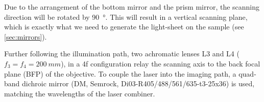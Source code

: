     Due to the arrangement of the bottom mirror and the prism mirror, the scanning direction will be rotated by \SI{90}{\degree}. This will result in a vertical scanning plane, which is exactly what we need to generate the light-sheet on the sample (see \autoref{sec:mirrors}).

    Further following the illumination path, two achromatic lenses L3 and L4 ($f_3 = f_4 = \SI{200}{mm}$), in a 4f configuration relay the scanning axis to the back focal plane (BFP) of the objective. To couple the laser into the imaging path, a quad-band dichroic mirror (DM, Semrock, Di03-R405/488/561/635-t3-25x36) is used, matching the wavelengths of the laser combiner.

